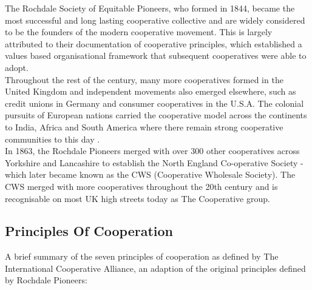 The Rochdale Society of Equitable Pioneers, who formed in 1844\cite{Pioneers}, became the most successful and long lasting cooperative collective and are widely considered to be the founders of the modern cooperative movement. This is largely attributed to their documentation of cooperative principles\cite{Principles}, which established a values based organisational framework that subsequent cooperatives were able to adopt.\\

Throughout the rest of the century, many more cooperatives formed in the United Kingdom and independent movements also emerged elsewhere, such as credit unions in Germany and consumer cooperatives in the U.S.A. The colonial pursuits of European nations carried the cooperative model across the continents to India, Africa and South America where there remain strong cooperative communities to this day \cite{Coops_india_wiki}\cite{Coops_india}\cite{Kenya_coops}.\\   

In 1863, the Rochdale Pioneers merged with over 300 other cooperatives across Yorkshire and Lancashire to establish the North England Co-operative Society - which later became known as the CWS (Cooperative Wholesale Society). The CWS merged with more cooperatives throughout the 20th century and is recognisable on most UK high streets today as The Cooperative group.\\

\subsection{Principles Of Cooperation}
A brief summary of the seven principles of cooperation as defined by The International Cooperative Alliance\cite{ICA}, an adaption of the original principles defined by Rochdale Pioneers:\\

